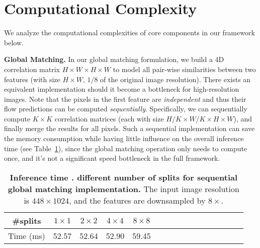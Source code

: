 \documentclass[10pt,twocolumn,letterpaper]{article}
\begin{document}
\section{Computational Complexity}

We analyze the computational complexities of core components in our framework below.

{\bf Global Matching.} In our global matching formulation, we build a 4D correlation matrix $H \times W \times H \times W$ to model all pair-wise similarities between two features (with size $H \times W$, $1/8$ of the original image resolution). There exists an equivalent implementation should it become a bottleneck for high-resolution images. Note that the pixels in the first feature are \emph{independent} and thus their flow predictions can be computed \emph{sequentially}. Specifically, we can sequentially compute $K \times K$ correlation matrices (each with size $H/K \times W/K \times H \times W$), and finally merge the results for all pixels. Such a sequential implementation can save the memory consumption while having little influence on the overall inference time (see Table~\ref{tab:seq_global_match}), since the global matching operation only needs to compute once, and it's not a significant speed bottleneck in the full framework.

\begin{table}[H]
    \centering
    \setlength{\tabcolsep}{3.pt} %
    \begin{tabular}{cccccccccccccccc}
    \toprule
    
    \#splits & $1 \times 1$ & $2 \times 2$ & $4 \times 4$ & $8 \times 8$ \\
    
    \midrule
    
    Time (ms) & 52.57 & 52.64 & 52.90 & 59.45 \\
    
    \bottomrule
    \end{tabular}
    \vspace{-5pt}
    \caption{\textbf{Inference time \vs. different number of splits for sequential global matching implementation.} The input image resolution is $448 \times 1024$, and the features are downsampled by $8 \times$.
    }
    \label{tab:seq_global_match}
    \vspace{-10pt}
    
\end{table}
\end{document}
